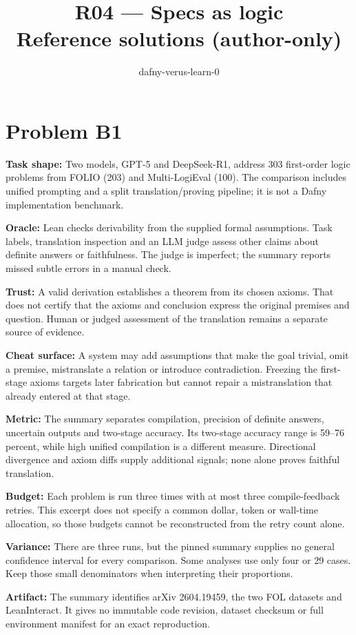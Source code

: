 \documentclass[11pt]{article}
\title{R04 --- Specs as logic \\ \large Reference solutions (author-only)}
\author{dafny-verus-learn-0}
\date{}
\begin{document}
\maketitle
\section*{Problem B1}\label{ans:B1}
\begin{answer}
\textbf{Task shape:} Two models, GPT-5 and DeepSeek-R1, address 303 first-order logic problems from FOLIO (203) and Multi-LogiEval (100). The comparison includes unified prompting and a split translation/proving pipeline; it is not a Dafny implementation benchmark.

\textbf{Oracle:} Lean checks derivability from the supplied formal assumptions. Task labels, translation inspection and an LLM judge assess other claims about definite answers or faithfulness. The judge is imperfect; the summary reports missed subtle errors in a manual check.

\textbf{Trust:} A valid derivation establishes a theorem from its chosen axioms. That does not certify that the axioms and conclusion express the original premises and question. Human or judged assessment of the translation remains a separate source of evidence.

\textbf{Cheat surface:} A system may add assumptions that make the goal trivial, omit a premise, mistranslate a relation or introduce contradiction. Freezing the first-stage axioms targets later fabrication but cannot repair a mistranslation that already entered at that stage.

\textbf{Metric:} The summary separates compilation, precision of definite answers, uncertain outputs and two-stage accuracy. Its two-stage accuracy range is 59--76 percent, while high unified compilation is a different measure. Directional divergence and axiom diffs supply additional signals; none alone proves faithful translation.

\textbf{Budget:} Each problem is run three times with at most three compile-feedback retries. This excerpt does not specify a common dollar, token or wall-time allocation, so those budgets cannot be reconstructed from the retry count alone.

\textbf{Variance:} There are three runs, but the pinned summary supplies no general confidence interval for every comparison. Some analyses use only four or 29 cases. Keep those small denominators when interpreting their proportions.

\textbf{Artifact:} The summary identifies arXiv 2604.19459, the two FOL datasets and LeanInteract. It gives no immutable code revision, dataset checksum or full environment manifest for an exact reproduction.
\end{answer}
\end{document}
